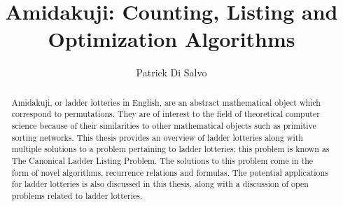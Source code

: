\documentclass[11pt,dvipsnames]{gthesis}
\begin{document}
\title{Amidakuji: Counting, Listing and Optimization Algorithms}

\author{Patrick Di Salvo}







\maketitle


\begin{abstract}

Amidakuji, or ladder lotteries in English, are an abstract mathematical object which correspond to permutations. 
They are of interest to the field of theoretical computer science because of their similarities to other 
mathematical objects such as primitive sorting networks.
This thesis provides an overview of ladder lotteries along with multiple solutions to a problem pertaining to ladder lotteries;
this problem is known as The Canonical Ladder Listing Problem. 
The solutions to this problem come in the form of novel algorithms, recurrence relations and formulas. 
The potential applications for ladder lotteries is also discussed in this thesis, 
along with a discussion of open problems related to ladder lotteries.

\medskip

\small
\centering

\end{abstract}

\begin{frontmatter}





\tableofcontents
\listoftables
\listoffigures

\end{frontmatter}

\dsp


\ssp
  
  
\dsp


\appendix

\end{document}
